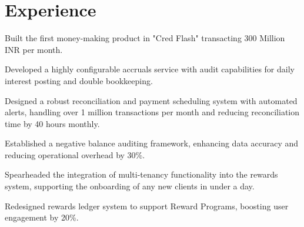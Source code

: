 \documentclass[]{deedy-resume-openfont}
\begin{document}
\begin{minipage}[t]{0.69\textwidth} 


\section{Experience}

\vspace{2em}
\begin{tightemize}
\item Built the first money-making product in "Cred Flash" transacting 300 Million INR per month.
\item Developed a highly configurable accruals service with audit capabilities for daily interest posting and double bookkeeping.
\item Designed a robust reconciliation and payment scheduling system with automated alerts, handling over 1 million transactions per month and reducing reconciliation time by 40 hours monthly.
\item Established a negative balance auditing framework, enhancing data accuracy and reducing operational overhead by 30\%.
\end{tightemize}
\sectionsep

\vspace{\topsep}
\begin{tightemize}
\item Spearheaded the integration of multi-tenancy functionality into the rewards system, supporting the onboarding of any new clients in under a day.
\item Redesigned rewards ledger system to support Reward Programs, boosting user engagement by 20\%.
\end{tightemize}
\sectionsep


\end{minipage}
\end{document}
